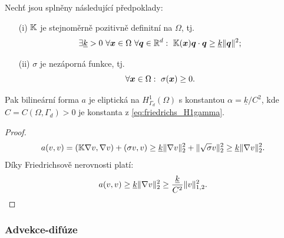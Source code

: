 \begin{veta}
Nechť jsou splněny následující předpoklady:
\begin{itemize}
\item[(i)] ${\mathbb{K}}$ je stejnoměrně pozitivně definitní na $\Omega$, tj.
\[ \exists \underline k>0~\forall \mathbf{\boldsymbol{x}}\in\Omega~\forall\mathbf{\boldsymbol{q}}\in\mathbb R^d:~{\mathbb{K}}(\mathbf{\boldsymbol{x}})\mathbf{\boldsymbol{q}}\cdot\mathbf{\boldsymbol{q}}\ge\underline k\|\mathbf{\boldsymbol{q}}\|^2; \]
\item[(ii)] $\sigma$ je nezáporná funkce, tj.
\[ \forall\mathbf{\boldsymbol{x}}\in\Omega:~\sigma(\mathbf{\boldsymbol{x}})\ge 0. \]
\end{itemize}
Pak bilineární forma $a$ je eliptická na $H^1_{\Gamma_d}(\Omega)$ s konstantou $\alpha=\underline k/{C^2}$, kde $C=C(\Omega,\Gamma_d)>0$ je konstanta z \eqref{eq:friedrichs_H1gamma}.
\end{veta}
\begin{proof}
\[ a(v,v) = ({\mathbb{K}}\nabla v,\nabla v) + (\sigma v,v)
\ge \underline k\|\nabla v\|_2^2 + \|\sqrt{\sigma}v\|_2^2 \ge \underline k\|\nabla v\|_2^2. \] 
Díky Friedrichsově nerovnosti platí:
\[ a(v,v) \ge \underline k\|\nabla v\|_2^2 \ge \frac{\underline k}{C^2}\|v\|_{1,2}^2. \]
\end{proof}



\subsubsection{Advekce-difúze}

